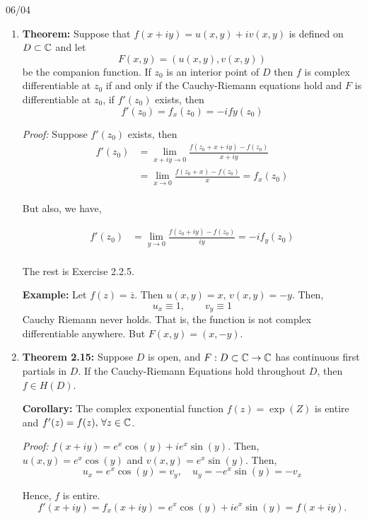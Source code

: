 \documentclass[12pt]{article}
\begin{document}
\newpage

06/04 

\begin{enumerate}
    \item \textbf{Theorem:} Suppose that $f(x+iy) = u(x,y) + iv(x,y)$ is defined on $D \subset \mathbb C$ and let 
    \[F(x,y) = (u(x,y), v(x,y))\]
    be the companion function. If $z_0$ is an interior point of $D$ then $f$ is complex differentiable at $z_0$ if and only if the Cauchy-Riemann equations hold and $F$ is differentiable at $z_0$, if $f'(z_0)$ exists, then 
    \[f'(z_0) = f_x(z_0) = -ify(z_0)\]

    \textit{Proof:} Suppose $f'(z_0)$ exists, then 
    \begin{align*}
        f'(z_0) &= \lim_{x+iy \to 0} \frac{f(z_0 + x + iy) - f(z_0)}{x+ iy} \\ 
        &= \lim_{x \to 0} \frac{f(z_0 + x) - f(z_0)}{x} = f_x(z_0)\\ 
    \end{align*}

    But also, we have, 

     \begin{align*}
        f'(z_0)
        &= \lim_{y \to 0} \frac{f(z_0 + iy) - f(z_0)}{iy} = -if_y(z_0)\\ 
    \end{align*}

    The rest is Exercise 2.2.5.

    \textbf{Example:} Let $f(z) = \overline{z}$. Then $u(x,y) = x, \, v(x,y) = -y$. Then, 
    \[u_x \equiv 1, \qquad v_y \equiv 1\]
    Cauchy Riemann never holds. That is, the function is not complex differentiable anywhere. But $F(x,y) = (x,-y)$. 

    \item \textbf{Theorem 2.15:} Suppose $D$ is open, and $F: D \subset \mathbb C \to \mathbb C$ has continuous first partials in $D$. If the Cauchy-Riemann Equations hold throughout $D$, then $f \in H(D)$. 
    
    \textbf{Corollary:} The complex exponential function $f(z) = \exp(Z)$ is entire and $f'(z) = f(z), \, \forall z \in \mathbb C$. 

    \textit{Proof:} $f(x+iy) = e^x \cos(y) + ie^x\sin(y)$. Then, $u(x,y) = e^x\cos(y)$ and $v(x,y) = e^x\sin(y)$. Then, 
    \[u_x = e^x \cos(y) = v_y, \quad u_y = -e^x \sin(y) = -v_x\]

    Hence, $f$ is entire. 
    \[f'(x+iy) = f_x(x+iy) = e^x \cos(y) + ie^x\sin(y) = f(x+iy).\]


\end{enumerate}
\end{document}
